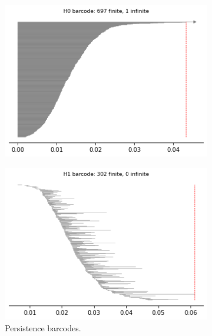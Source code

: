 \begin{figure}[H]
\begin{subfigure}[b]{0.25\textwidth}
\end{subfigure}
\begin{subfigure}[b]{0.24\textwidth}
    \includegraphics[width=\textwidth]{figures/X1_H0_barcode.png}
    \caption{}
\end{subfigure}
\begin{subfigure}[b]{0.24\textwidth}
    \includegraphics[width=\textwidth]{figures/X1_H1_barcode.png}
        \caption{Persistence barcodes.}
\end{subfigure}
\begin{subfigure}[b]{0.24\textwidth}

\end{subfigure}
\end{figure}
